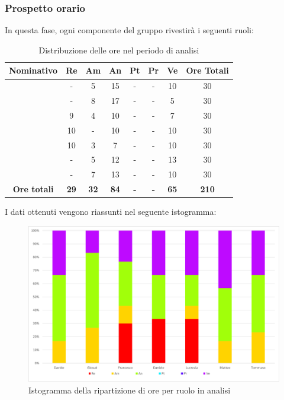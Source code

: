 \subsubsection{Prospetto orario}
In questa fase, ogni componente del gruppo rivestirà i seguenti ruoli:
\begin{table}[H]
		\begin{center}
			\setlength{\aboverulesep}{0pt}
			\setlength{\belowrulesep}{0pt}
			\setlength{\extrarowheight}{.75ex}
			\begin{tabular}{ c c c c c c c c }
				\rowcolor{AzzurroGruppo!30} 
				\textbf{Nominativo} & \textbf{Re} & \textbf{Am} & \textbf{An} & \textbf{Pt} & \textbf{Pr} & \textbf{Ve} & \textbf{Ore Totali}  \\
				\toprule
				\Davide    & -  & 5  & 15 & - & - & 10 & 30 \\
				\Giosue    & -  & 8  & 17 & - & - & 5  & 30 \\
				\Francesco & 9  & 4  & 10 & - & - & 7  & 30\\
				\Daniele   & 10 & -  & 10 & - & - & 10 & 30\\
				\Lucrezia  & 10  & 3 & 7 & - & - & 10 & 30\\
				\Matteo    & -  & 5  & 12 & - & - & 13 & 30\\
				\Tommaso   & -  & 7  & 13 & - & - & 10  & 30\\
				 \textbf{Ore totali} & \textbf{29} & \textbf{32} & \textbf{84} & \textbf{-} & \textbf{-} & \textbf{65} & \textbf{210} \\
				\bottomrule
			\end{tabular}
			\caption{Distribuzione delle ore nel periodo di analisi}
		\end{center}
	\end{table}
I dati ottenuti vengono riassunti nel seguente istogramma:
\begin{figure}[H]
    \centering
    \includegraphics[scale = 0.5]{components/img/Analisi-isto.png}
    \caption{ Istogramma della ripartizione di ore per ruolo in analisi}
    \label{fig:istogramma ripartizione ore , fase di analisi}
\end{figure}
